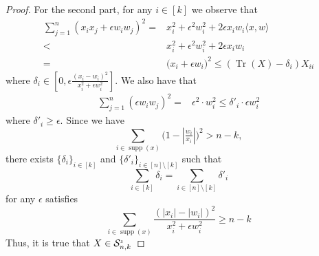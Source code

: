 \documentclass[11pt]{amsart}
\newcommand{\Sint}[2]{\ensuremath{\mathcal{S}_{#1,#2}^{\textit{\tiny{z}}}}}
\theoremstyle{plain}
\theoremstyle{definition}
\theoremstyle{remark}
\DeclareMathOperator{\tr}{Tr}
\DeclareMathOperator{\supp}{supp}
\begin{document}
\begin{appendices}
\begin{proof}
			For the second part, for any \(i \in [k]\) we observe that 
			\begin{equation}
				\begin{split}
					\sum_{j=1}^n (x_ix_j+ \epsilon w_iw_j)^2
					= & x^2_i  + \epsilon^2w^2_i  + 2\epsilon x_iw_i \langle x,w\rangle\\
					< & x^2_i  + \epsilon^2w^2_i  + 2\epsilon x_iw_i\\
					= & \Big(x_i + \epsilon w_i \Big)^2
                    \leq  (\tr(X)-\delta_i)X_{ii}
				\end{split}
			\end{equation}
            where \(\delta_i \in [0, \epsilon\tfrac{(x_i - w_i)^2}{x_i^2 + \epsilon w_i^2}]\). We also have that
			\begin{equation}
				\begin{split}
					\sum_{j=1}^n (\epsilon w_iw_j)^2
					= & \epsilon^2 \cdot w^2_i 
					\leq \delta'_i \cdot \epsilon w^2_i
				\end{split}
			\end{equation}
            where \(\delta'_i \geq \epsilon\). Since we have 
            \[
            \sum_{i\in\supp(x)}\big(1-|\tfrac{w_i}{x_i}|\big)^2>n-k,
            \]
            there exists \(\{\delta_i\}_{i\in[k]}\) and \(\{\delta'_i\}_{i\in[n]\setminus[k]}\) such that
			\begin{equation}
				\sum_{i\in [k]} \delta_i = \sum_{i\in [n]\setminus [k]} \delta'_i
			\end{equation}
			for any \(\epsilon\) satisfies
            \[
            \sum_{i\in\supp(x)} \frac{(|x_i| - |w_i|)^2}{x_i^2 + \epsilon w_i^2} \geq n - k
            \]
            Thus, it is true that \(X \in \Sint{n}{k}\) 
		\end{proof}
		

\end{appendices}
\end{document}
